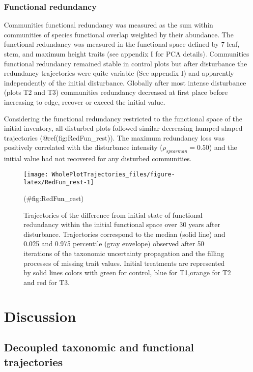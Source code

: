 \documentclass[fleqn,10pt]{ArtEcoFoG} %
\theoremstyle{definition}
\theoremstyle{definition}
\theoremstyle{definition}
\theoremstyle{remark}
\begin{document}
\subsubsection{Functional redundancy}\label{functional-redundancy}

Communities functional redundancy was measured as the sum within
communities of species functional overlap weighted by their abundance.
The functional redundancy was measured in the functional space defined
by 7 leaf, stem, and maximum height traits (see appendix I for PCA
details). Communities functional redundancy remained stable in control
plots but after disturbance the redundancy trajectories were quite
variable (See appendix I) and apparently independently of the initial
disturbance. Globally after most intense disturbance (plots T2 and T3)
communities redundancy decreased at first place before increasing to
edge, recover or exceed the initial value.

Considering the functional redundancy restricted to the functional space
of the initial inventory, all disturbed plots followed similar
decreasing humped shaped trajectories (@ref(fig:RedFun\_rest)). The
maximum redundancy loss was positively correlated with the disturbance
intensity (\(\rho_{spearman}=0.50\)) and the initial value had not
recovered for any disturbed communities.

\begin{figure}

{\centering \texttt{[image: WholePlotTrajectories\_files/figure-latex/RedFun\_rest-1]} 

}

\caption{Trajectories of the difference from initial state of functional redundancy within the initial functional space over 30 years after disturbance. Trajectories correspond to the median (solid line) and 0.025 and 0.975 percentile (gray envelope) observed after 50 iterations of the taxonomic uncertainty propagation and the filling processes of missing trait values. Initial treatments are represented by solid lines colors with green for control, blue for T1,orange for T2 and red for T3.}(\#fig:RedFun_rest)
\end{figure}

\section{Discussion}\label{discussion}

\subsection{Decoupled taxonomic and functional
trajectories}\label{decoupled-taxonomic-and-functional-trajectories}
\end{document}
